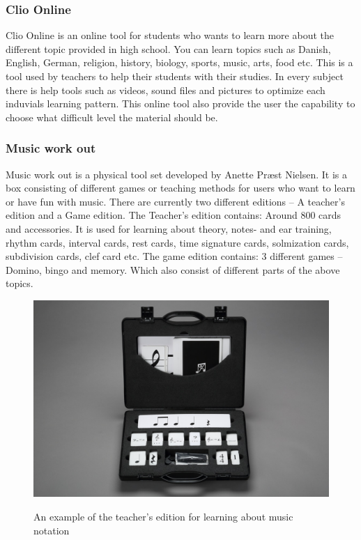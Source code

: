 \subsubsection{Clio Online} 
Clio Online is an online tool for students who wants to learn more about the different topic provided in high school. You can learn topics such as Danish, English, German, religion, history, biology, sports, music, arts, food etc. This is a tool used by teachers to help their students with their studies. In every subject there is help tools such as videos, sound files and pictures to optimize each induvials learning pattern. This online tool also provide the user the capability to choose what difficult level the material should be. \cite{ClioOnline}


\subsubsection{Music work out}
Music work out is a physical tool set developed by Anette Præst Nielsen. It is a box consisting of different games or teaching methods for users who want to learn or have fun with music. There are currently two different editions – A teacher’s edition and a Game edition.  The Teacher’s edition contains: Around 800 cards and accessories. It is used for learning about theory, notes- and ear training, rhythm cards, interval cards, rest cards, time signature cards, solmization cards, subdivision cards, clef card etc. The game edition contains: 3 different games – Domino, bingo and memory. Which also consist of different parts of the above topics. \cite{MusicWorkout}

\begin{figure}[H]
	\centering
	\includegraphics[width=0.7\linewidth]{figure/Analysis/musicworkout}
	\label{fig:musicworkout}
	\caption{An example of the teacher's edition for learning about music notation \cite{MusicWorkout}}
\end{figure}

